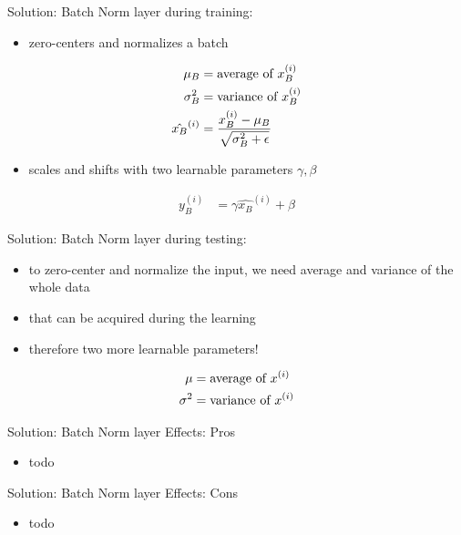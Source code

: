 \begin{frame}{Solution: Batch Norm layer}
    during training:
    \begin{itemize}
    	\item zero-centers and normalizes a batch
    \end{itemize}
	\begin{align*}
		\mu_B &= \textup{average of $x_B^{(i)}$}\\
		\sigma_B^2 &= \textup{variance of $x_B^{(i)}$}\\
		\hat{x_B}^{(i)} &= \frac{x_B^{(i)} - \mu_B}{\sqrt{\sigma^2_B + \epsilon}}
	\end{align*}
	\begin{itemize}
		\item scales and shifts with two learnable parameters $\gamma, \beta$
	\end{itemize}
	\begin{align*}
		y_B^{(i)} &= \gamma \hat{x_B}^{(i)} + \beta
	\end{align*}
\end{frame}
\begin{frame}{Solution: Batch Norm layer}
	during testing:
	\begin{itemize}
		\item to zero-center and normalize the input, we need average and variance of the whole data
		\item that can be acquired during the learning
		\item therefore two more learnable parameters!
	\end{itemize}
	\begin{align*}
		\mu &= \textup{average of $x^{(i)}$}\\
		\sigma^2 &= \textup{variance of $x^{(i)}$}\\
	\end{align*}
\end{frame}
\begin{frame}{Solution: Batch Norm layer}
	Effects: Pros
	\begin{itemize}
		\item todo
	\end{itemize}
\end{frame}
\begin{frame}{Solution: Batch Norm layer}
	Effects: Cons
	\begin{itemize}
		\item todo
	\end{itemize}
\end{frame}



